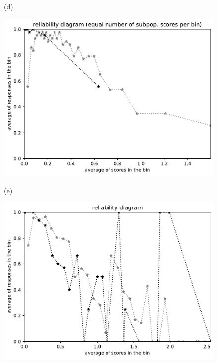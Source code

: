 \documentclass{article}
\newlength{\vertsep}
\newlength{\imsize}
\begin{document}
\begin{figure}
\begin{centering}
(d)
\parbox{\imsize}{\includegraphics[width=\imsize]
{../codes/unweighted/nll-1-323-monarch-monarch-butterfly-milkweed-butterfly-Danaus-plexippus_342-wild-boar-boar-Sus-scrofaequisamps30.pdf}}
\quad\quad
(e)
\parbox{\imsize}{\includegraphics[width=\imsize]
{../codes/unweighted/nll-1-323-monarch-monarch-butterfly-milkweed-butterfly-Danaus-plexippus_342-wild-boar-boar-Sus-scrofaequiscore30.pdf}}

\vspace{\vertsep}


\end{centering}
\end{figure}
\end{document}
